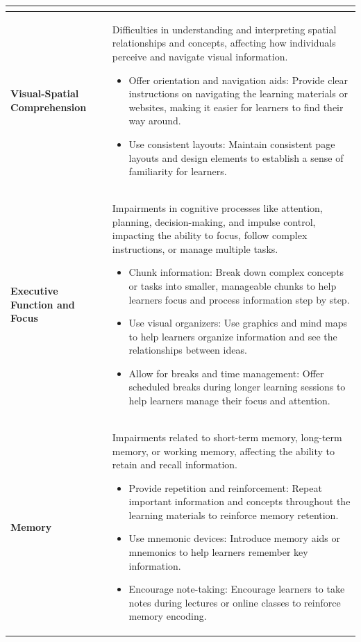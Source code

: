 \documentclass{article}
\begin{document}
\begin{longtable}{p{4cm}p{10cm}}
\begin{itemize}
    \end{itemize} \\
    \midrule
    \textbf{Visual-Spatial Comprehension} & Difficulties in understanding and interpreting spatial relationships and concepts, affecting how individuals perceive and navigate visual information.
    \begin{itemize}
        \item Offer orientation and navigation aids: Provide clear instructions on navigating the learning materials or websites, making it easier for learners to find their way around.
        \item Use consistent layouts: Maintain consistent page layouts and design elements to establish a sense of familiarity for learners.
    \end{itemize} \\
    \midrule
    \textbf{Executive Function and Focus} & Impairments in cognitive processes like attention, planning, decision-making, and impulse control, impacting the ability to focus, follow complex instructions, or manage multiple tasks.
    \begin{itemize}
        \item Chunk information: Break down complex concepts or tasks into smaller, manageable chunks to help learners focus and process information step by step.
        \item Use visual organizers: Use graphics and mind maps to help learners organize information and see the relationships between ideas.
        \item Allow for breaks and time management: Offer scheduled breaks during longer learning sessions to help learners manage their focus and attention.
    \end{itemize} \\
    \midrule
    \textbf{Memory} & Impairments related to short-term memory, long-term memory, or working memory, affecting the ability to retain and recall information.
    \begin{itemize}
        \item Provide repetition and reinforcement: Repeat important information and concepts throughout the learning materials to reinforce memory retention.
        \item Use mnemonic devices: Introduce memory aids or mnemonics to help learners remember key information.
        \item Encourage note-taking: Encourage learners to take notes during lectures or online classes to reinforce memory encoding.
    \end{itemize} \\
    \bottomrule
\end{longtable}
\end{document}
